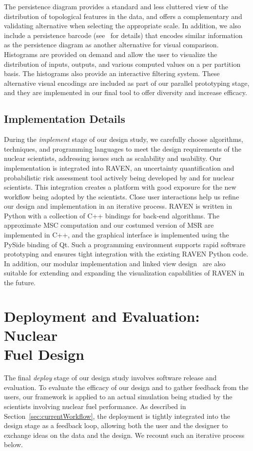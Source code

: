 The persistence diagram provides a standard and less cluttered view of the distribution of topological features in the data, and offers a complementary and validating alternative when selecting the appropriate scale.
%
In addition, we also include a persistence
barcode (see~\cite{CarlssonZomorodianCollins2004} for details) that encodes similar information as the persistence diagram as another alternative for visual comparison.
%
Histograms are provided on demand and allow the user to visualize the distribution of inputs, outputs, and various computed values on a per partition basis.
%
The histograms also provide an interactive filtering system.
%
These alternative visual encodings are included as part of our parallel prototyping stage, and they are implemented in our final tool to offer diversity and increase efficacy.

\subsection{Implementation Details}

During the \emph{implement} stage of our design study, we carefully choose algorithms, techniques, and programming languages to meet the design requirements of the nuclear scientists, addressing issues such as scalability and usability.
%
Our implementation is integrated into RAVEN, an uncertainty quantification and probabilistic risk assessment tool actively being developed by and for nuclear scientists.
%
This integration creates a platform with good exposure for the new workflow being adopted by the scientists.
%
Close user interactions help us refine our design and implementation in an iterative process.
%
RAVEN is written in Python with a collection of C++ bindings for back-end algorithms.
%
The approximate MSC computation and our costumed version of MSR are implemented in C++, and the graphical interface is implemented using the PySide binding of Qt.
%
Such a programming environment supports rapid software prototyping and ensures tight integration with the existing RAVEN Python code.
%
In addition, our modular implementation and linked view design~\cite{Roberts2007}  are also suitable for extending and expanding the visualization capabilities of RAVEN in the future.

\section{Deployment and Evaluation: Nuclear\\Fuel Design}
\label{sec:saApplication}
The final \emph{deploy} stage of our design study involves software release and evaluation.
%
To evaluate the efficacy of our design and to gather feedback from the users, our framework is applied to an actual simulation being studied by the scientists involving nuclear fuel performance.
%
As described in Section~\ref{sec:currentWorkflow}, the deployment is tightly integrated into the design stage as a feedback loop, allowing both the user and the designer to exchange ideas on the data and the design.
%
We recount such an iterative process below.

